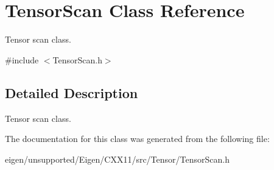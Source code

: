 \hypertarget{class_tensor_scan}{}\section{Tensor\+Scan Class Reference}
\label{class_tensor_scan}


Tensor scan class.  




{\ttfamily \#include $<$Tensor\+Scan.\+h$>$}



\subsection{Detailed Description}
Tensor scan class. 

The documentation for this class was generated from the following file\+:\begin{DoxyCompactItemize}
\item 
eigen/unsupported/\+Eigen/\+C\+X\+X11/src/\+Tensor/\+Tensor\+Scan.\+h\end{DoxyCompactItemize}
